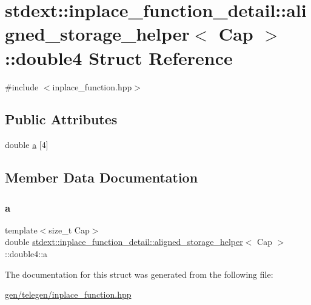 \hypertarget{structstdext_1_1inplace__function__detail_1_1aligned__storage__helper_1_1double4}{}\section{stdext\+:\+:inplace\+\_\+function\+\_\+detail\+:\+:aligned\+\_\+storage\+\_\+helper$<$ Cap $>$\+:\+:double4 Struct Reference}
\label{structstdext_1_1inplace__function__detail_1_1aligned__storage__helper_1_1double4}


{\ttfamily \#include $<$inplace\+\_\+function.\+hpp$>$}

\subsection*{Public Attributes}
\begin{DoxyCompactItemize}
\item 
double \hyperlink{structstdext_1_1inplace__function__detail_1_1aligned__storage__helper_1_1double4_a02373c793fa67c6b57d24d2f34b58504}{a} \mbox{[}4\mbox{]}
\end{DoxyCompactItemize}


\subsection{Member Data Documentation}
\mbox{\label{structstdext_1_1inplace__function__detail_1_1aligned__storage__helper_1_1double4_a02373c793fa67c6b57d24d2f34b58504}} 
\subsubsection{\texorpdfstring{a}{a}}
{\footnotesize\ttfamily template$<$size\+\_\+t Cap$>$ \\
double \hyperlink{unionstdext_1_1inplace__function__detail_1_1aligned__storage__helper}{stdext\+::inplace\+\_\+function\+\_\+detail\+::aligned\+\_\+storage\+\_\+helper}$<$ Cap $>$\+::double4\+::a}



The documentation for this struct was generated from the following file\+:\begin{DoxyCompactItemize}
\item 
\hyperlink{gen_2telegen_2inplace__function_8hpp}{gen/telegen/inplace\+\_\+function.\+hpp}\end{DoxyCompactItemize}
